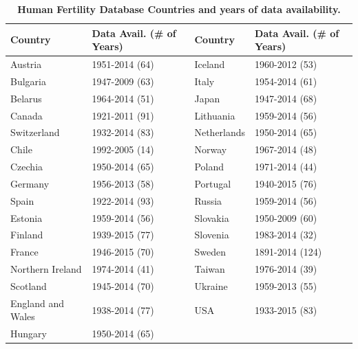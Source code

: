 \documentclass[12pt]{article}
\begin{document}
\begin{table}[H]

\caption{\label{tab:make-table-hfd-countries}\label{HFDCountries}\textbf{Human Fertility Database Countries and years of data availability.}}
\centering
\begin{tabular}{llll}
\toprule
Country & Data Avail. (\# of Years) & Country & Data Avail. (\# of Years)\\
\midrule
Austria & 1951-2014 (64) & Iceland & 1960-2012 (53)\\
Bulgaria & 1947-2009 (63) & Italy & 1954-2014 (61)\\
Belarus & 1964-2014 (51) & Japan & 1947-2014 (68)\\
Canada & 1921-2011 (91) & Lithuania & 1959-2014 (56)\\
Switzerland & 1932-2014 (83) & Netherlands & 1950-2014 (65)\\
\addlinespace
Chile & 1992-2005 (14) & Norway & 1967-2014 (48)\\
Czechia & 1950-2014 (65) & Poland & 1971-2014 (44)\\
Germany & 1956-2013 (58) & Portugal & 1940-2015 (76)\\
Spain & 1922-2014 (93) & Russia & 1959-2014 (56)\\
Estonia & 1959-2014 (56) & Slovakia & 1950-2009 (60)\\
\addlinespace
Finland & 1939-2015 (77) & Slovenia & 1983-2014 (32)\\
France & 1946-2015 (70) & Sweden & 1891-2014 (124)\\
Northern Ireland & 1974-2014 (41) & Taiwan & 1976-2014 (39)\\
Scotland & 1945-2014 (70) & Ukraine & 1959-2013 (55)\\
England and Wales & 1938-2014 (77) & USA & 1933-2015 (83)\\
\addlinespace
Hungary & 1950-2014 (65) &  & \\
\bottomrule
\end{tabular}
\end{table}

\newpage



\end{document}
